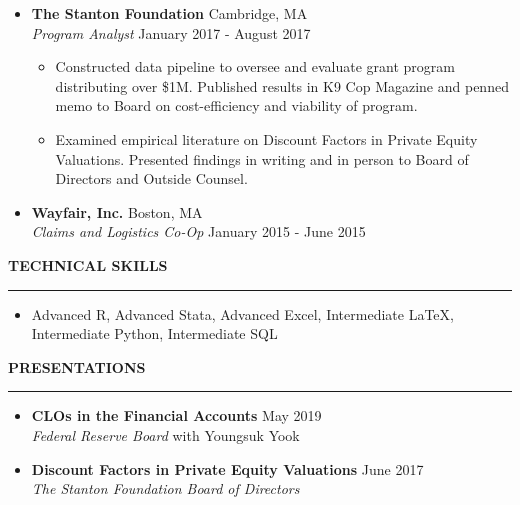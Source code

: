 \documentclass[10pt]{article} %
\begin{document}
\begin{itemize}[topsep=3pt,itemsep= 2pt,partopsep=0pt, parsep= 0pt, leftmargin = *]
	\item[]   {\bf The Stanton Foundation} \hfill{Cambridge, MA} \\ 
			\emph{Program Analyst} 	 \hfill {January 2017 - August 2017} 	
		\begin{itemize}  [topsep=1pt,itemsep= 3pt,partopsep=0pt, parsep= 0pt, leftmargin = *] 

			\item Constructed data pipeline to oversee and evaluate grant program distributing over \$1M. Published results in K9 Cop Magazine and penned memo to Board  on cost-efficiency and viability of program.
			\item Examined empirical literature on Discount Factors in Private Equity Valuations.  Presented findings in writing and in person to Board of Directors and Outside Counsel.
        	\end{itemize}
        	\item[]   {\bf Wayfair, Inc.} \hfill{Boston, MA} \\ 
        	\emph{Claims and Logistics Co-Op} 	 \hfill {January 2015 - June 2015} 
\end{itemize}
\smallskip
\MakeUppercase{\bf Technical Skills}
\smallskip
\hrule

\begin{itemize}[topsep=3pt,itemsep= 2pt,partopsep=0pt, parsep= 0pt, leftmargin = *]
	\item[]  Advanced R, Advanced Stata, Advanced Excel, Intermediate {\LaTeX}, Intermediate Python,  Intermediate SQL
\end{itemize}
\smallskip
\MakeUppercase{\bf Presentations}
\smallskip
\hrule

\begin{itemize}[topsep=3pt,itemsep= 2pt,partopsep=0pt, parsep= 0pt, leftmargin = *]
	\item[]  {\bf CLOs in the Financial Accounts } \hfill {May 2019} \\
			\emph{Federal Reserve Board} {\textbullet} with Youngsuk Yook
	\item[]  {\bf Discount Factors in Private Equity Valuations} \hfill {June 2017} \\
			\emph{The Stanton Foundation Board of Directors} 
\end{itemize}
\end{document}

